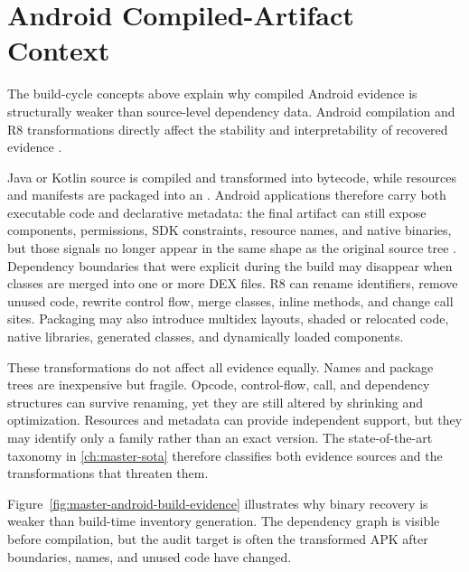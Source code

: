 \section{Android Compiled-Artifact Context}

The build-cycle concepts above explain why compiled Android evidence is
structurally weaker than source-level dependency data. Android compilation
and R8 transformations directly affect the stability and interpretability of
recovered evidence \cite{androidShrinkCode}.

Java or Kotlin source is compiled and transformed into \DEX bytecode, while
resources and manifests are packaged into an \APK. Android applications
therefore carry both executable code and declarative metadata: the final
artifact can still expose components, permissions, SDK constraints, resource
names, and native binaries, but those signals no longer appear in the same
shape as the original source tree \cite{androidAppFundamentals,androidBuildOverview,androidManifestOverview,androidApkAnalyzer}. Dependency boundaries that were explicit
during the build may disappear when classes are merged into one or more DEX
files. R8 can rename identifiers, remove unused code, rewrite control flow,
merge classes, inline methods, and change call sites. Packaging may also
introduce multidex layouts, shaded or relocated code, native libraries,
generated classes, and dynamically loaded components.

These transformations do not affect all evidence equally. Names and package
trees are inexpensive but fragile. Opcode, control-flow, call, and dependency
structures can survive renaming, yet they are still altered by shrinking and
optimization. Resources and metadata can provide independent support, but they
may identify only a family rather than an exact version. The state-of-the-art
taxonomy in \cref{ch:master-sota} therefore classifies both evidence sources
and the transformations that threaten them.

Figure~\ref{fig:master-android-build-evidence} illustrates why binary
recovery is weaker than build-time inventory generation. The dependency graph
is visible before compilation, but the audit target is often the transformed
APK after boundaries, names, and unused code have changed.

